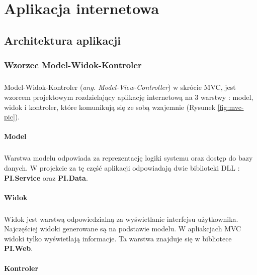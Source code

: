 \chapter{Aplikacja internetowa}
\section{Architektura aplikacji} %
\label{sec:architektura_aplikacji}

\subsection{Wzorzec Model-Widok-Kontroler} %
\label{sub:wzorzec_model_widok_kontroler}
\paragraph{} %
\label{par:paragraph_name}
Model-Widok-Kontroler (\textit{ang. Model-View-Controller}) w skrócie MVC, jest wzorcem projektowym rozdzielający aplikację internetową na 3 warstwy : model, widok i kontroler, które komunikują się ze sobą wzajemnie (Rysunek \ref{fig:mvc-pic}). 

\subsubsection{Model}
\paragraph{}
Warstwa modelu odpowiada za reprezentację logiki systemu oraz dostęp do bazy danych. W projekcie za tę część aplikacji odpowiadają dwie biblioteki DLL : \textbf{PI.Service} oraz \textbf{PI.Data}.

\subsubsection{Widok}
\paragraph{}
Widok jest warstwą odpowiedzialną za wyświetlanie interfejsu użytkownika. Najczęściej widoki generowane są na podstawie modelu. W apliakcjach MVC widoki tylko wyświetlają informacje. Ta warstwa znajduje się w bibliotece \textbf{PI.Web}.

\subsubsection{Kontroler}

